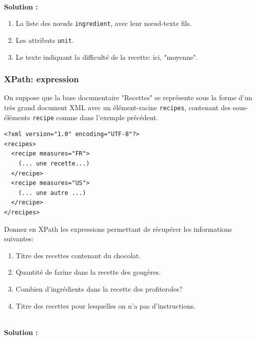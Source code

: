 \documentclass[9pt,a4paper]{article}
\newenvironment{solution}[0]{
~\\ \color{red} \textbf{Solution :}\color{black}}{%
}
\begin{document}
\begin{solution}
\begin{enumerate}
  \item La liste des n{\oe}uds \texttt{ingredient}, avec leur n{\oe}ud-texte fils.
  \item Les attributs \texttt{unit}.
  \item Le texte indiquant la difficulté de la recette: ici, "moyenne".
  \end{enumerate}
\end{solution}

\subsubsection*{XPath: expression}

On suppose que la base documentaire "Recettes" se représente sous la forme d'un très grand document 
XML avec un élément-racine \texttt{recipes}, contenant des sous-éléments \texttt{recipe} comme dans
l'exemple précédent. 
\begin{verbatim}
<?xml version="1.0" encoding="UTF-8"?>
<recipes>
  <recipe measures="FR">
    (... une recette...)
  </recipe>
  <recipe measures="US">
    (... une autre ...)
  </recipe>
</recipes>
\end{verbatim}

Donnez en XPath les expressions permettant de récupérer les informations suivantes:

\begin{enumerate}
\item Titre des recettes contenant du chocolat.
\item Quantité  de farine dans la recette des gougères.
\item Combien d'ingrédients dans la recette des profiteroles?
\item Titre des recettes pour lesquelles on n'a pas d'instructions.
\end{enumerate}


\begin{solution}
\end{solution}
\end{document}
